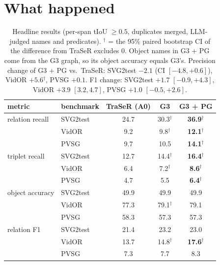 \documentclass[11pt,openany]{book}
\newcommand{\sig}{\ensuremath{^\dagger}}
\newcommand{\hsec}{\section*{What happened}}
\begin{document}
\hsec
\begin{table}[h]
\centering
\begin{tabular}{@{}llccc@{}}
\toprule
metric & benchmark & TraSeR (A0) & G3 & \textbf{G3 + PG} \\
\midrule
relation recall & SVG2test & 24.7 & 30.3\sig & \textbf{36.9}\sig \\
                & VidOR    & 9.2  & 9.8\sig  & \textbf{12.1}\sig \\
                & PVSG     & 9.7  & 10.5     & \textbf{14.1}\sig \\
\midrule
triplet recall  & SVG2test & 12.7 & 14.4\sig & \textbf{16.4}\sig \\
                & VidOR    & 6.4  & 7.2\sig  & \textbf{8.6}\sig \\
                & PVSG     & 4.7  & 5.5      & \textbf{6.4}\sig \\
\midrule
object accuracy & SVG2test & 49.9 & 49.9     & 49.9 \\
                & VidOR    & 77.3 & 79.1\sig & 79.1 \\
                & PVSG     & 58.3 & 57.3     & 57.3 \\
\midrule
relation F1     & SVG2test & 21.4 & 23.2     & 23.0 \\
                & VidOR    & 13.7 & 14.8\sig & \textbf{17.6}\sig \\
                & PVSG     & 7.3  & 7.7      & 8.3 \\
\bottomrule
\end{tabular}
\caption{Headline results (per-span tIoU $\ge 0.5$, duplicates merged, LLM-judged names and predicates). \sig{} = the 95\% paired
bootstrap CI of the difference from TraSeR excludes 0. Object names in G3 + PG come from the G3 graph, so its object accuracy equals
G3's. Precision change of G3 + PG vs.\ TraSeR: SVG2test $-2.1$ (CI $[-4.8,+0.6]$), VidOR $+5.6$\sig, PVSG $+0.1$.
F1 change: SVG2test $+1.7$ $[-0.9,+4.3]$, VidOR $+3.9$ $[3.2,4.7]$, PVSG $+1.0$ $[-0.5,+2.6]$.}
\label{tab:headline}
\end{table}
\end{document}
